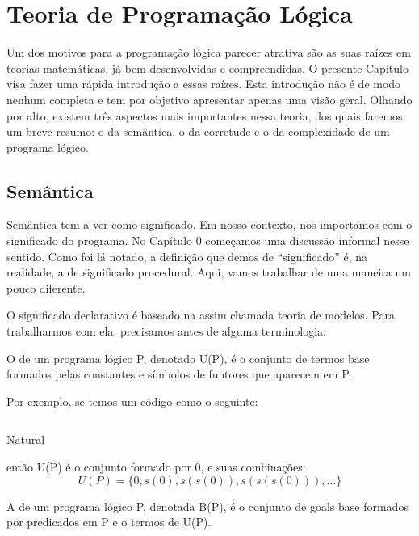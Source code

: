 \documentclass{article}
\begin{document}
\section{Teoria de Programação Lógica}

Um dos motivos para a programação lógica parecer atrativa são as suas raízes em teorias matemáticas, já bem desenvolvidas e compreendidas. O presente Capítulo visa fazer uma rápida introdução a essas raízes. Esta introdução não é de modo nenhum completa e tem por objetivo apresentar apenas uma visão geral. Olhando por alto, existem três aspectos mais importantes nessa teoria, dos quais faremos um breve resumo: o da semântica, o da corretude e o da complexidade de um programa lógico.

\subsection{Semântica}
Semântica tem a ver como significado. Em nosso contexto, nos importamos com o significado do programa. No Capítulo 0 %
começamos uma discussão informal nesse sentido. Como foi lá notado, a definição que demos de ``significado'' é, na realidade, a de significado procedural. Aqui, vamos trabalhar de uma maneira um pouco diferente.

O significado declarativo é baseado na assim chamada teoria de modelos. Para trabalharmos com ela, precisamos antes de alguma terminologia:

\begin{definition} O  de um programa lógico P, denotado U(P), é o conjunto de termos base formados pelas constantes e símbolos de funtores que aparecem em P.
\end{definition}

Por exemplo, se temos um código como o seguinte:

    \begin{listing}
\inputminted{prolog}{../Exemplos/Cap2/prog1_natural.pl}
\caption{Natural}\label{lst:natural}
    \end{listing}

    \noindent então U(P) é o conjunto formado por 0,  e suas combinações:
\[
  U(P) = \{0, s(0), s(s(0)), s(s(s(0))), ...\}
\]

\begin{definition} A  de um programa lógico P, denotada B(P), é o conjunto de goals base formados por predicados em P e o termos de U(P).
\end{definition}
\end{document}
